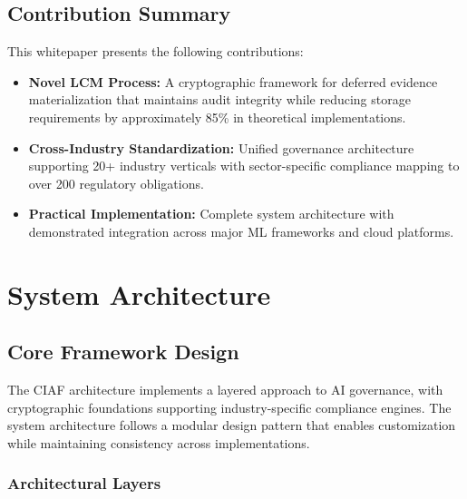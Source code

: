 \documentclass[12pt,a4paper]{article}
\begin{document}
\subsection{Contribution Summary}

This whitepaper presents the following contributions:

\begin{itemize}
\item \textbf{Novel LCM Process:} A cryptographic framework for deferred evidence materialization that maintains audit integrity while reducing storage requirements by approximately 85\% in theoretical implementations.

\item \textbf{Cross-Industry Standardization:} Unified governance architecture supporting 20+ industry verticals with sector-specific compliance mapping to over 200 regulatory obligations.

\item \textbf{Practical Implementation:} Complete system architecture with demonstrated integration across major ML frameworks and cloud platforms.
\end{itemize}

\section{System Architecture}

\subsection{Core Framework Design}

The CIAF architecture implements a layered approach to AI governance, with cryptographic foundations supporting industry-specific compliance engines. The system architecture follows a modular design pattern that enables customization while maintaining consistency across implementations.

\subsubsection{Architectural Layers}
\end{document}
